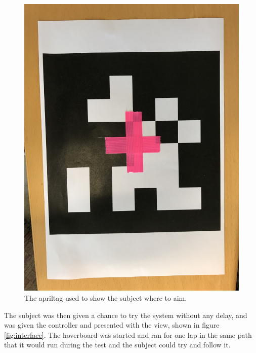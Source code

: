 \documentclass[nofilelist]{cslthse-msc}
\begin{document}
\begin{figure}[!hbt]
   \centering
   \includegraphics[scale=0.08]{images/apriltag.jpg} 
   \caption{The apriltag used to show the subject where to aim.}
   \label{fig:apriltag}
\end{figure}

The subject was then given a chance to try the system without any delay, and was given the controller and presented with the view, shown in figure \ref{fig:interface}. The hoverboard was started and ran for one lap in the same path that it would run during the test and the subject could try and follow it.
\end{document}
